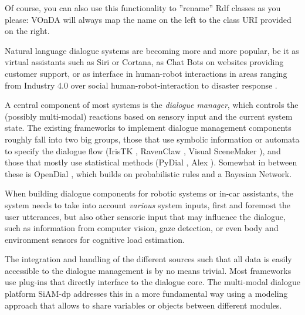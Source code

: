 \documentclass[a4paper]{report}
\newcommand{\vonda}{VOnDA\xspace}
\begin{document}
Of course, you can also use this functionality to ''rename'' Rdf classes as you
please: \vonda will always map the name on the left to the class URI provided
on the right.


%
Natural language dialogue systems are becoming more and more popular, be it as
virtual assistants such as Siri or Cortana, as Chat Bots on websites providing
customer support, or as interface in human-robot interactions in areas ranging
from Industry 4.0 \citep{schwartz2016hybrid} over social human-robot-interaction
\citep{alize2010} to disaster response \citep{kruijff2015tradr}.

A central component of most systems is the \emph{dialogue manager}, which
controls the (possibly multi-modal) reactions based on sensory input and the
current system state. The existing frameworks to implement dialogue management
components roughly fall into two big groups, those that use symbolic
information or automata to specify the dialogue flow (IrisTK
\citep{2012iristk}, RavenClaw \citep{bohus2009ravenclaw}, Visual SceneMaker
\citep{gebhard2012visual}), and those that mostly use statistical methods
(PyDial \cite{ultes2017pydial}, Alex \citep{jurvcivcek2014alex}). Somewhat in
between these is OpenDial \citep{lison2015developing}, which builds on
probabilistic rules and a Bayesian Network.

When building dialogue components for robotic systems or in-car assistants, the system
needs to take into account \emph{various} system inputs, first and foremost the
user utterances, but also other sensoric input that may influence the dialogue,
such as information from computer vision, gaze detection, or even body and
environment sensors for cognitive load estimation.

The integration and handling of the different sources such that all data is
easily accessible to the dialogue management is by no means trivial. Most
frameworks use plug-ins that directly interface to the dialogue core. The
multi-modal dialogue platform SiAM-dp \citep{nesselrath2014siam}
addresses this in a more fundamental way using a modeling approach that allows
to share variables or objects between different modules.
\end{document}
